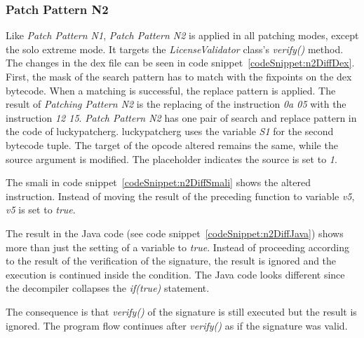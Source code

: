 \subsubsection{Patch Pattern N2}
Like \textit{Patch Pattern N1}, \textit{Patch Pattern N2} is applied in all patching modes, except the solo extreme mode.
It targets the \textit{LicenseValidator} class's \textit{verify()} method.
\newline
The changes in the \gls{dex} file can be seen in code snippet~\ref{codeSnippet:n2DiffDex}.
First, the mask of the search pattern has to match with the fixpoints on the dex bytecode.
When a matching is successful, the replace pattern is applied.
The result of \textit{Patching Pattern N2} is the replacing of the instruction \textit{0a 05} with the instruction \textit{12 15}.
\textit{Patch Pattern N2} has one pair of search and replace pattern in the code of \gls{luckypatcherg}.
\gls{luckypatcherg} uses the variable \textit{S1} for the second bytecode tuple.
The target of the opcode altered remains the same, while the source argument is modified.
The placeholder indicates the source is set to \textit{1}.
\newline

The smali in code snippet~\ref{codeSnippet:n2DiffSmali} shows the altered instruction.
Instead of moving the result of the preceding function to variable \textit{v5}, \textit{v5} is set to \textit{true}.
\newline

The result in the Java code (see code snippet~\ref{codeSnippet:n2DiffJava}) shows more than just the setting of a variable to \textit{true}.
Instead of proceeding according to the result of the verification of the signature, the result is ignored and the execution is continued inside the condition.
The Java code looks different since the decompiler collapses the \textit{if(true)} statement.
\newline

The consequence is that \textit{verify()} of the signature is still executed but the result is ignored.
The program flow continues after  \textit{verify()} as if the signature was valid.

